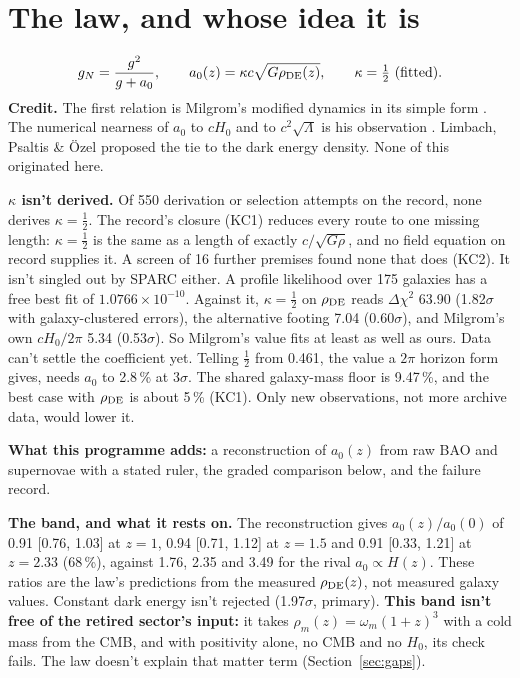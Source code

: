 \documentclass[10pt]{article}
\begin{document}
\section{The law, and whose idea it is}
\[
g_N=\frac{g^2}{g+a_0},\qquad a_0(z)=\kappa c\sqrt{G\rho_{\rm DE}(z)},\qquad \kappa=\tfrac12\ \text{(fitted)}.
\]
\textbf{Credit.} The first relation is Milgrom's modified dynamics in its simple form \cite{M83}. The numerical nearness of $a_0$ to $cH_0$ and to $c^2\sqrt{\Lambda}$ is his observation \cite{M83,M99}. Limbach, Psaltis \& \"Ozel \cite{LPO} proposed the tie to the dark energy density. None of this originated here.

\textbf{$\kappa$ isn't derived.} Of 550 derivation or selection attempts on the record, none derives $\kappa=\tfrac12$. The record's closure (KC1) reduces every route to one missing length: $\kappa=\tfrac12$ is the same as a length of exactly $c/\sqrt{G\rho}$, and no field equation on record supplies it. A screen of 16 further premises found none that does (KC2). It isn't singled out by SPARC either. A profile likelihood over 175 galaxies has a free best fit of $1.0766\times10^{-10}$. Against it, $\kappa=\tfrac12$ on $\rho_{\rm DE}$ reads $\Delta\chi^2$ 63.90 (1.82$\sigma$ with galaxy-clustered errors), the alternative footing 7.04 (0.60$\sigma$), and Milgrom's own $cH_0/2\pi$ 5.34 (0.53$\sigma$). So Milgrom's value fits at least as well as ours. Data can't settle the coefficient yet. Telling $\tfrac12$ from 0.461, the value a $2\pi$ horizon form gives, needs $a_0$ to 2.8\,\% at 3$\sigma$. The shared galaxy-mass floor is 9.47\,\%, and the best case with $\rho_{\rm DE}$ is about 5\,\% (KC1). Only new observations, not more archive data, would lower it.

\textbf{What this programme adds:} a reconstruction of $a_0(z)$ from raw BAO and supernovae with a stated ruler, the graded comparison below, and the failure record.

\textbf{The band, and what it rests on.} The reconstruction gives $a_0(z)/a_0(0)$ of 0.91 [0.76, 1.03] at $z=1$, 0.94 [0.71, 1.12] at $z=1.5$ and 0.91 [0.33, 1.21] at $z=2.33$ (68\,\%), against 1.76, 2.35 and 3.49 for the rival $a_0\propto H(z)$. These ratios are the law's predictions from the measured $\rho_{\rm DE}(z)$, not measured galaxy values. Constant dark energy isn't rejected (1.97$\sigma$, primary). \textbf{This band isn't free of the retired sector's input:} it takes $\rho_m(z)=\omega_m(1+z)^3$ with a cold mass from the CMB, and with positivity alone, no CMB and no $H_0$, its check fails. The law doesn't explain that matter term (Section~\ref{sec:gaps}).
\end{document}
